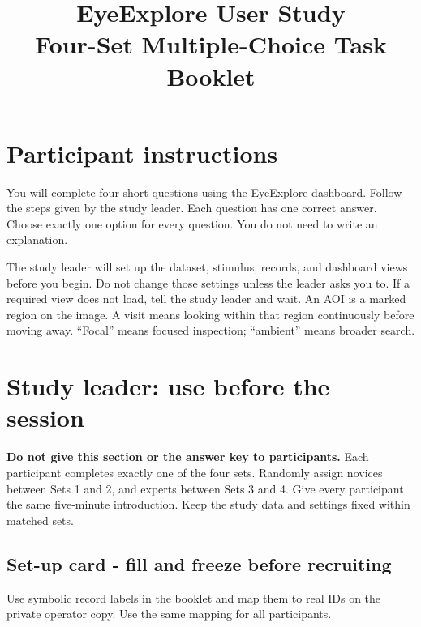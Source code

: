 \documentclass[11pt]{article}
\title{\textcolor{eyeblue}{EyeExplore User Study}\\
\large Four-Set Multiple-Choice Task Booklet}
\author{}
\date{}
\begin{document}
\maketitle

\section*{Participant instructions}
You will complete four short questions using the EyeExplore dashboard. Follow
the steps given by the study leader. Each question has one correct answer.
Choose exactly one option for every question. You do not need to write an
explanation.

The study leader will set up the dataset, stimulus, records, and dashboard
views before you begin. Do not change those settings unless the leader asks
you to. If a required view does not load, tell the study leader and wait.
An AOI is a marked region on the image. A visit means looking within that
region continuously before moving away. ``Focal'' means focused inspection;
``ambient'' means broader search.

\section*{Study leader: use before the session}
\textbf{Do not give this section or the answer key to participants.} Each
participant completes exactly one of the four sets. Randomly assign novices
between Sets 1 and 2, and experts between Sets 3 and 4. Give every participant
the same five-minute introduction. Keep the study data and settings fixed
within matched sets.

\subsection*{Set-up card - fill and freeze before recruiting}
Use symbolic record labels in the booklet and map them to real IDs on the
private operator copy. Use the same mapping for all participants.
\end{document}
